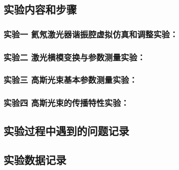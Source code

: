 \documentclass[dvipsnames, svgnames,a4paper,11pt]{article}
\begin{document}
\subsection{实验内容和步骤}



	\subsubsection{实验一 \quad 氦氖激光器谐振腔虚拟仿真和调整实验：}

		

	
	\subsubsection{实验二 \quad 激光横模变换与参数测量实验：}
	
	
		

	\subsubsection{实验三 \quad 高斯光束基本参数测量实验：}
	

		

	
	\subsubsection{实验四 \quad 高斯光束的传播特性实验：}

	


	\subsection{实验过程中遇到的问题记录}

		


\subsection{实验数据记录}


	
\end{document}
